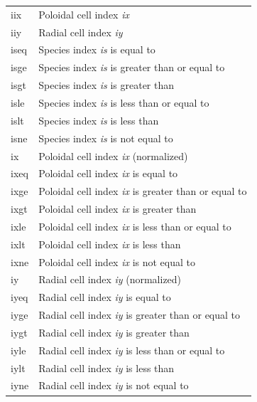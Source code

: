 \documentclass[a4paper,10pt]{report}
\begin{document}
\begin{center}
\begin{longtable}{|l|l|}
    iix      & \index{b2plot, iix} Poloidal cell index {\em ix} \\
    iiy      & \index{b2plot, iiy} Radial cell index {\em iy} \\
    iseq     & \index{b2plot, iseq} Species index {\em is} is equal to \\
    isge     & \index{b2plot, isge} Species index {\em is} is greater than or equal to \\
    isgt     & \index{b2plot, isgt} Species index {\em is} is greater than \\
    isle     & \index{b2plot, isle} Species index {\em is} is less than or equal to \\
    islt     & \index{b2plot, islt} Species index {\em is} is less than \\
    isne     & \index{b2plot, isne} Species index {\em is} is not equal to \\
    ix       & \index{b2plot, ix} Poloidal cell index {\em ix} (normalized) \\
    ixeq     & \index{b2plot, ixeq} Poloidal cell index {\em ix} is equal to \\
    ixge     & \index{b2plot, ixge} Poloidal cell index {\em ix} is greater than or equal to \\
    ixgt     & \index{b2plot, ixgt} Poloidal cell index {\em ix} is greater than \\
    ixle     & \index{b2plot, ixle} Poloidal cell index {\em ix} is less than or equal to \\
    ixlt     & \index{b2plot, ixlt} Poloidal cell index {\em ix} is less than \\
    ixne     & \index{b2plot, ixne} Poloidal cell index {\em ix} is not equal to \\
    iy       & \index{b2plot, iy} Radial cell index {\em iy} (normalized) \\
    iyeq     & \index{b2plot, iyeq} Radial cell index {\em iy} is equal to \\
    iyge     & \index{b2plot, iyge} Radial cell index {\em iy} is greater than or equal to \\
    iygt     & \index{b2plot, iygt} Radial cell index {\em iy} is greater than \\
    iyle     & \index{b2plot, iyle} Radial cell index {\em iy} is less than or equal to \\
    iylt     & \index{b2plot, iylt} Radial cell index {\em iy} is less than \\
    iyne     & \index{b2plot, iyne} Radial cell index {\em iy} is not equal to \\

\end{longtable}
\end{center}
\end{document}
